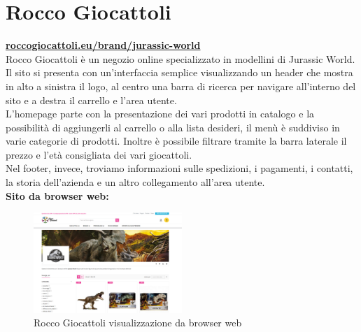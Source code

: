 \section{Rocco Giocattoli}
\href{https://shop.roccogiocattoli.eu/brand/jurassic-world}{\textbf{roccogiocattoli.eu/brand/jurassic-world}}
\\
Rocco Giocattoli è un negozio online specializzato in modellini di Jurassic World. Il sito si presenta con un'interfaccia semplice visualizzando un header che mostra in alto a sinistra il logo, al centro una barra di ricerca per navigare all'interno del sito e a destra il carrello e l'area utente.
\\
L'homepage parte con la presentazione dei vari prodotti in catalogo e la possibilità di aggiungerli al carrello o alla lista desideri, il menù è suddiviso in varie categorie di prodotti. Inoltre è possibile filtrare tramite la barra laterale il prezzo e l'età consigliata dei vari giocattoli. 
\\
Nel footer, invece, troviamo informazioni sulle spedizioni, i pagamenti, i contatti, la storia dell'azienda e un altro collegamento all'area utente.
\\

\textbf{Sito da browser web:}
\begin{figure}[H]
        \centering
        \includegraphics[width=0.50\textwidth]{immagini/roccogiocattoli.png}
        \caption{Rocco Giocattoli visualizzazione da browser web}
    \end{figure}
    

